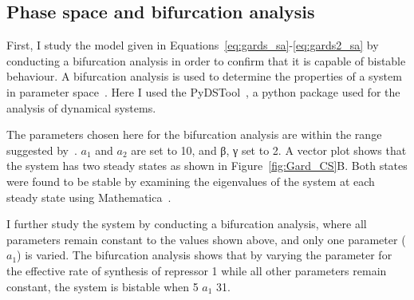 \subsection{Phase space and bifurcation analysis}
\label{sec:bifurc}


First, I study the model given in Equations~\ref{eq:gards_sa}-\ref{eq:gards2_sa} by conducting a bifurcation analysis in order to confirm that it is capable of bistable behaviour. A bifurcation analysis is used to determine the properties of a system in parameter space~\autocite{Alon:2007}. Here I used the PyDSTool~\autocite{Clewley:2012kj}, a python package used for the analysis of dynamical systems. 


The parameters chosen here for the bifurcation analysis are within the range suggested by~\textcite{Gardner:2000vha}.  $a_1$ and $a_2$ are set to 10, and β, γ set to 2. A vector plot shows that the system has two steady states as shown in Figure~\ref{fig:Gard_CS}B. Both states were found to be stable by examining the eigenvalues of the system at each steady state using Mathematica~\autocite{mathematica:2016}.


I further study the system by conducting a bifurcation analysis, where all parameters remain constant to the values shown above, and only one parameter ($a_1$) is varied. The bifurcation analysis shows that by varying the parameter for the effective rate of synthesis of repressor 1 while all other parameters remain constant, the system is bistable when 5 \ge{} $a_1$ \le{} 31.



